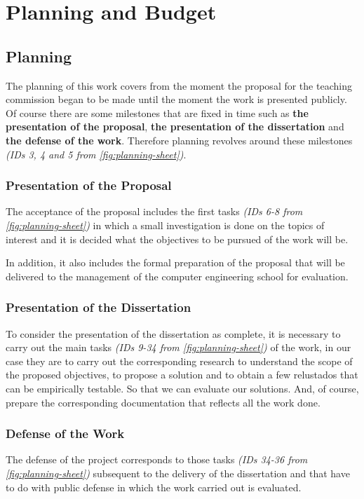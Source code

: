 \chapter{Planning and Budget}
\label{ch:planning-and-budget}

\section{Planning}
The planning of this work covers from the moment the proposal for the teaching commission began
to be made until the moment the work is presented publicly. Of course there are some milestones
that are fixed in time such as \textbf{the presentation of the proposal}, \textbf{the presentation of the dissertation}
and \textbf{the defense of the work}. Therefore planning revolves around these milestones \textit{(IDs
3, 4 and 5 from \cref{fig:planning-sheet})}.

\subsection{Presentation of the Proposal}
The acceptance of the proposal includes the first tasks \textit{(IDs
6-8 from \cref{fig:planning-sheet})} in which a small investigation is done on the
topics of interest and it is decided what the objectives to be pursued of the work will be.

In addition, it also includes the formal preparation of the proposal that will be delivered to the
management of the computer engineering school for evaluation.

\subsection{Presentation of the Dissertation}
To consider the presentation of the dissertation as complete, it is necessary to carry out the main
tasks \textit{(IDs 9-34 from \cref{fig:planning-sheet})} of the work, in our case they are to
carry out the corresponding research to understand the scope of the proposed objectives, to propose a
solution and to obtain a few relustados that can be empirically testable. So that we can evaluate our
solutions. And, of course, prepare the corresponding documentation that reflects all the work done.

\subsection{Defense of the Work}
The defense of the project corresponds to those tasks \textit{(IDs 34-36 from \cref{fig:planning-sheet})}
subsequent to the delivery of the dissertation and that have to do with public defense in which the work carried out is evaluated.

